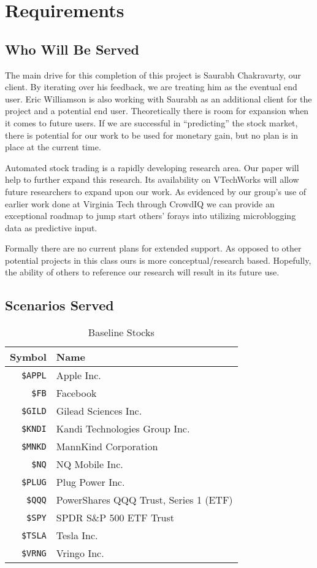 
\section{Requirements}

\subsection{Who Will Be Served}

The main drive for this completion of this project is Saurabh Chakravarty, our client.
By iterating over his feedback, we are treating him as the eventual end user.
Eric Williamson is also working with Saurabh as an additional client for the project and a potential end user.
Theoretically there is room for expansion when it comes to future users.
If we are successful in “predicting” the stock market, there is potential for our work to be used for monetary gain, but no plan is in place at the current time. 

Automated stock trading is a rapidly developing research area.
Our paper will help to further expand this research.
Its availability on VTechWorks will allow future researchers to expand upon our work.
As evidenced by our group's use of earlier work done at Virginia Tech through CrowdIQ we can provide an exceptional roadmap to jump start others' forays into utilizing microblogging data as predictive input.  

Formally there are no current plans for extended support.
As opposed to other potential projects in this class ours is more conceptual/research based.
Hopefully, the ability of others to reference our research will result in its future use.

\subsection{Scenarios Served}

\begin{table}
  \centering
  \begin{tabular}{ | r | l | }
    \hline
    Symbol & Name \\ \hline
    \texttt{\$APPL} & Apple Inc. \\ \hline
    \texttt{\$FB} & Facebook \\ \hline
    \texttt{\$GILD} & Gilead Sciences Inc. \\ \hline
    \texttt{\$KNDI} & Kandi Technologies Group Inc. \\ \hline
    \texttt{\$MNKD} & MannKind Corporation \\ \hline
    \texttt{\$NQ} & NQ Mobile Inc. \\\hline
    \texttt{\$PLUG} & Plug Power Inc. \\\hline
    \texttt{\$QQQ} & PowerShares QQQ Trust, Series 1 (ETF) \\\hline
    \texttt{\$SPY} & SPDR S\&P 500 ETF Trust \\\hline
    \texttt{\$TSLA} & Tesla Inc. \\\hline
    \texttt{\$VRNG} & Vringo Inc. \\\hline
  \end{tabular}
  \caption{Baseline Stocks}\label{tab:stocks}
\end{table}

